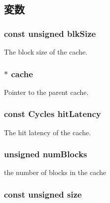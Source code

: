 \subsection{変数}
\hypertarget{classBaseTags_a87b03496724866a3daf3e8ebeb831290}{
\subsubsection[{blkSize}]{\setlength{\rightskip}{0pt plus 5cm}const unsigned {\bf blkSize}}}
\label{classBaseTags_a87b03496724866a3daf3e8ebeb831290}
The block size of the cache. \hypertarget{classBaseTags_a5cc08dee7231c774489c04728dd5f169}{
\subsubsection[{cache}]{$\ast$ {\bf cache}}}
\label{classBaseTags_a5cc08dee7231c774489c04728dd5f169}
Pointer to the parent cache. \hypertarget{classBaseTags_a4075fdc5720f8f0f57c379c396e74718}{
\subsubsection[{hitLatency}]{\setlength{\rightskip}{0pt plus 5cm}const {\bf Cycles} {\bf hitLatency}}}
\label{classBaseTags_a4075fdc5720f8f0f57c379c396e74718}
The hit latency of the cache. \hypertarget{classBaseTags_af2c745d276c1a795177201764016234c}{
\subsubsection[{numBlocks}]{\setlength{\rightskip}{0pt plus 5cm}unsigned {\bf numBlocks}}}
\label{classBaseTags_af2c745d276c1a795177201764016234c}
the number of blocks in the cache \hypertarget{classBaseTags_ad3f1cf0299fe68eb9a68a7c67232c62d}{
\subsubsection[{size}]{\setlength{\rightskip}{0pt plus 5cm}const unsigned {\bf size}}}
